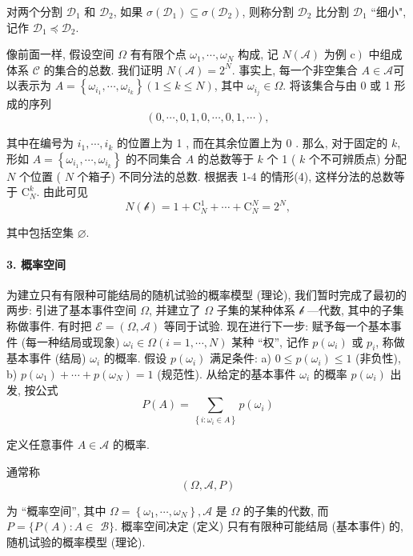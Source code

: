 对两个分割 $\mathscr{D}_1$ 和 $\mathscr{D}_2$, 如果 $\sigma\left(\mathscr{D}_1\right) \subseteq \sigma\left(\mathscr{D}_2\right)$, 则称分割 $\mathscr{D}_2$ 比分割 $\mathscr{D}_1$ ``细小", 记作 $\mathscr{D}_1 \preccurlyeq \mathscr{D}_2$.

像前面一样, 假设空间 $\Omega$ 有有限个点 $\omega_1, \cdots, \omega_N$ 构成, 记 $N(\mathscr{A})$ 为例 $\left.\mathrm{c}\right)$ 中组成体系 $\mathscr{C}$ 的集合的总数. 我们证明 $N(\mathscr{A})=2^N$. 事实上, 每一个非空集合 $A \in \mathscr{A}$可以表示为 $A=\left\{\omega_{i_1}, \cdots, \omega_{i_k}\right\}(1 \leq k \leq N)$, 其中 $\omega_{i_j} \in \Omega$. 将该集合与由 0 或 1 形成的序列
$$
(0, \cdots, 0,1,0, \cdots, 0,1, \cdots),
$$

其中在编号为 $i_1, \cdots, i_k$ 的位置上为 1 , 而在其余位置上为 0 . 那么, 对于固定的 $k$,形如 $A=\left\{\omega_{i_1}, \cdots, \omega_{i_k}\right\}$ 的不同集合 $A$ 的总数等于 $k$ 个 1 ( $k$ 个不可辨质点) 分配 $N$ 个位置 ( $N$ 个箱子) 不同分法的总数. 根据表 1-4 的情形(4), 这样分法的总数等于 $\mathrm{C}_N^k$. 由此可见
$$
N(\mathscr{b})=1+\mathrm{C}_N^1+\cdots+\mathrm{C}_N^N=2^N,
$$

其中包括空集 $\varnothing$.

\paragraph{3. 概率空间}
为建立只有有限种可能结局的随机试验的概率模型 (理论), 我们暂时完成了最初的两步: 引进了基本事件空间 $\Omega$, 并建立了 $\Omega$ 子集的某种体系 $\mathscr{b}$ —代数, 其中的子集称做事件. 有时把 $\mathscr{E}=(\Omega, \mathscr{A})$ 等同于试验. 现在进行下一步: 赋予每一个基本事件 (每一种结局或现象) $\omega_i \in \Omega(i=1, \cdots, N)$ 某种 ``权'', 记作 $p\left(\omega_i\right)$ 或 $p_i$, 称做基本事件 (结局) $\omega_i$ 的概率. 假设 $p\left(\omega_i\right)$ 满足条件:
a) $0 \leq p\left(\omega_i\right) \leq 1$ (非负性),
b) $p\left(\omega_1\right)+\cdots+p\left(\omega_N\right)=1$ (规范性).
从给定的基本事件 $\omega_i$ 的概率 $p\left(\omega_i\right)$ 出发, 按公式
$$
P(A)=\sum_{\left\{i: \omega_i \in A\right\}} p\left(\omega_i\right)
$$

定义任意事件 $A \in \mathscr{A}$ 的概率.

\begin{definition}
    通常称
$$
(\Omega, \mathscr{A}, P)
$$

为 ``概率空间'', 其中 $\Omega=\left\{\omega_1, \cdots, \omega_N\right\}, \mathscr{A}$ 是 $\Omega$ 的子集的代数, 而 $P=\{P(A): A \in$ $\mathscr{B}\}$. 概率空间决定 (定义) 只有有限种可能结局 (基本事件) 的, 随机试验的概率模型 (理论). 
\end{definition}

